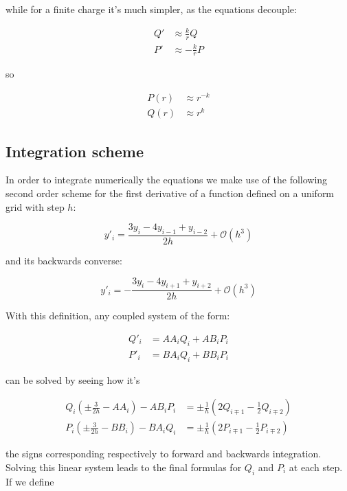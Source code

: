 \documentclass[]{report}
\begin{document}
while for a finite charge it's much simpler, as the equations decouple:

\begin{align}\label{dirac_sys_zero_sph}
Q' &\approx \frac{k}{r}Q  \\
P' &\approx -\frac{k}{r}P
\end{align}

so 

\begin{align}
P(r) &\approx r^{-k} \\
Q(r) &\approx r^k
\end{align}

\subsection{Integration scheme}

In order to integrate numerically the equations we make use of the following second order scheme for the first derivative of a function defined on a uniform grid with step $h$:

\begin{equation}
y'_i = \frac{3y_i-4y_{i-1}+y_{i-2}}{2h} + \mathcal{O}(h^3)
\end{equation}

and its backwards converse:

\begin{equation}
y'_i = -\frac{3y_i-4y_{i+1}+y_{i+2}}{2h} + \mathcal{O}(h^3)
\end{equation}

With this definition, any coupled system of the form:

\begin{align}
Q'_i &= AA_i Q_i + AB_iP_i \\
P'_i &= BA_i Q_i + BB_iP_i
\end{align}

can be solved by seeing how it's

\begin{align}
Q_i\left(\pm\frac{3}{2h}-AA_i\right) - AB_iP_i&= \pm\frac{1}{h}\left(2Q_{i\mp1}-\frac{1}{2}Q_{i\mp2}\right) \\
P_i\left(\pm\frac{3}{2h}-BB_i\right) - BA_iQ_i&= \pm\frac{1}{h}\left(2P_{i\mp1}-\frac{1}{2}P_{i\mp2}\right)
\end{align}

the signs corresponding respectively to forward and backwards integration. Solving this linear system leads to the final formulas for $Q_i$ and $P_i$ at each step. If we define
\end{document}
